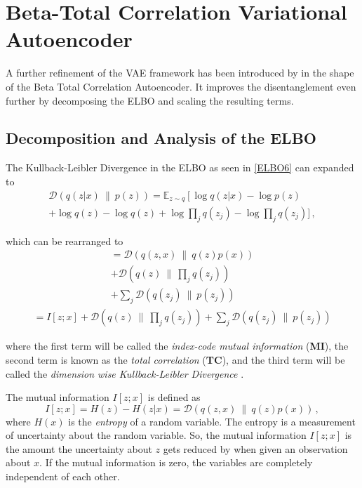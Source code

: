 \documentclass[a4paper]{IEEEtran}
\begin{document}
\section{Beta-Total Correlation Variational Autoencoder}
A further refinement of the VAE framework has been introduced by \cite{chen2019isolating} in the shape of the Beta Total Correlation Autoencoder. It improves the disentanglement even further by decomposing the ELBO and scaling the resulting terms.

\subsection{Decomposition and Analysis of the ELBO}
The Kullback-Leibler Divergence in the ELBO as seen in \eqref{ELBO6} can expanded to
\begin{align*}
\mathcal{D}(q(z|x) \ \| \ p(z)) =
	\mathbb{E}_{z \sim q} \left[ \log q(z|x) - \log p(z) \right. \\
	 + \log q(z) - \log q(z) + \log \prod_j q(z_j) - \log \prod_j q(z_j) ]\,,
\end{align*}

which can be rearranged to 
\begin{align*}
	= \mathcal{D}(q(z, x) \ \| \ q(z)p(x)) \\ + \mathcal{D}(q(z) \ \| \  \prod_{j} q(z_j)) \\ + \sum_j \mathcal{D}(q(z_j) \ \| \ p(z_j))
\end{align*}
\begin{align*}
	= I[z;x] + \mathcal{D}(q(z) \ \| \  \prod_{j} q(z_j)) + \sum_j \mathcal{D}(q(z_j) \ \| \ p(z_j))
\end{align*}

where the first term will be called the \textit{index-code mutual information} (\textbf{MI}), the second term is known as the \textit{total correlation} (\textbf{TC}), and the third term will be called the \textit{dimension wise Kullback-Leibler Divergence} \cite{chen2019isolating}.

The mutual information $I\left[ z; x \right]$ is defined as
\begin{equation}
	I[z;x] = H(z) - H(z|x) = \mathcal{D}(q(z, x) \ \| \ q(z)p(x))\,,
\end{equation}
where $H(x)$ is the \textit{entropy} of a random variable. The entropy is a measurement of uncertainty about the random variable. So, the mutual information $I[z;x]$ is the amount the uncertainty about $z$ gets reduced by when given an observation about $x$. If the mutual information is zero, the variables are completely independent of each other.
\end{document}
